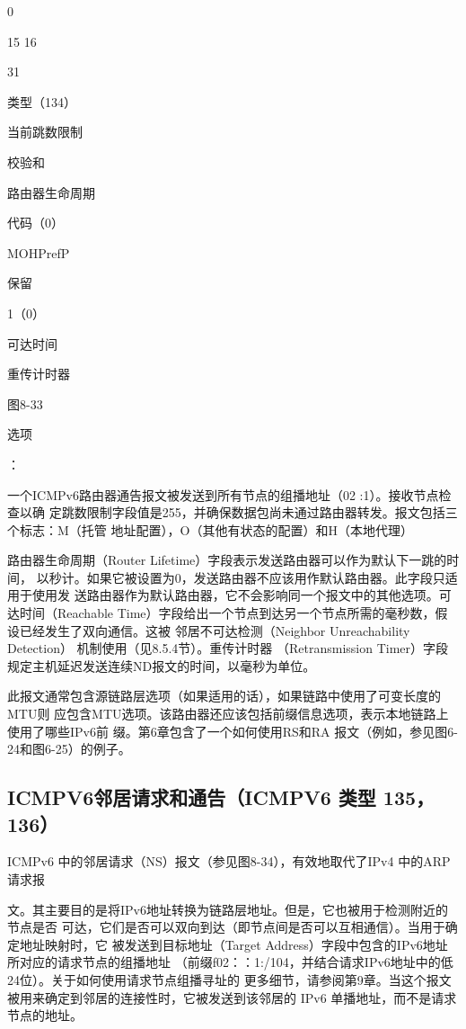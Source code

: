 0

15 16

31

类型（134）

当前跳数限制

校验和

路由器生命周期

代码（0）

MOHPrefP

保留

1（0）

可达时间

重传计时器

图8-33

选项

：

一个ICMPv6路由器通告报文被发送到所有节点的组播地址（02 :1）。接收节点检查以确
定跳数限制字段值是255，并确保数据包尚未通过路由器转发。报文包括三个标志：M（托管
地址配置），O（其他有状态的配置）和H（本地代理）

路由器生命周期（Router Lifetime）字段表示发送路由器可以作为默认下一跳的时间，
以秒计。如果它被设置为0，发送路由器不应该用作默认路由器。此字段只适用于使用发
送路由器作为默认路由器，它不会影响同一个报文中的其他选项。可达时间（Reachable
Time）字段给出一个节点到达另一个节点所需的毫秒数，假设已经发生了双向通信。这被
邻居不可达检测（Neighbor Unreachability Detection） 机制使用（见8.5.4节）。重传计时器
（Retransmission Timer）字段规定主机延迟发送连续ND报文的时间，以毫秒为单位。

此报文通常包含源链路层选项（如果适用的话），如果链路中使用了可变长度的MTU则
应包含MTU选项。该路由器还应该包括前缀信息选项，表示本地链路上使用了哪些IPv6前
缀。第6章包含了一个如何使用RS和RA 报文（例如，参见图6-24和图6-25）的例子。

\subsection{ICMPV6邻居请求和通告（ICMPV6 类型 135，136）}
ICMPv6 中的邻居请求（NS）报文（参见图8-34），有效地取代了IPv4 中的ARP请求报

文。其主要目的是将IPv6地址转换为链路层地址。但是，它也被用于检测附近的节点是否
可达，它们是否可以双向到达（即节点间是否可以互相通信）。当用于确定地址映射时，它
被发送到目标地址（Target Address）字段中包含的IPv6地址所对应的请求节点的组播地址
（前缀f02：：1:/104，并结合请求IPv6地址中的低24位）。关于如何使用请求节点组播寻址的
更多细节，请参阅第9章。当这个报文被用来确定到邻居的连接性时，它被发送到该邻居的
IPv6 单播地址，而不是请求节点的地址。

